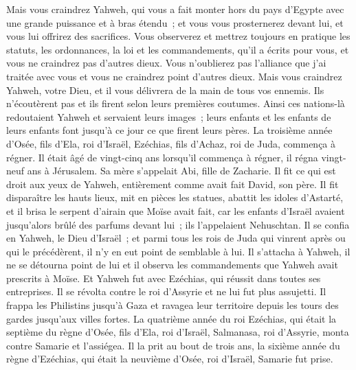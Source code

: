\begin{multicols}{2}
Mais vous craindrez Yahweh, qui vous a fait monter hors du pays d'Egypte avec une grande puissance et à bras étendu~; et vous vous prosternerez devant lui, et vous lui offrirez des sacrifices.
Vous observerez et mettrez toujours en pratique les statuts, les ordonnances, la loi et les commandements, qu'il a écrits pour vous, et vous ne craindrez pas d'autres dieux.
Vous n'oublierez pas l'alliance que j'ai traitée avec vous et vous ne craindrez point d'autres dieux.
Mais vous craindrez Yahweh, votre Dieu, et il vous délivrera de la main de tous vos ennemis.
Ils n'écoutèrent pas et ils firent selon leurs premières coutumes.
Ainsi ces nations-là redoutaient Yahweh et servaient leurs images~; leurs enfants et les enfants de leurs enfants font jusqu'à ce jour ce que firent leurs pères.
\VerseOne{}La troisième année d'Osée, fils d'Ela, roi d'Israël, Ezéchias, fils d'Achaz, roi de Juda, commença à régner.
Il était âgé de vingt-cinq ans lorsqu'il commença à régner, il régna vingt-neuf ans à Jérusalem. Sa mère s'appelait Abi, fille de Zacharie.
Il fit ce qui est droit aux yeux de Yahweh, entièrement comme avait fait David, son père.
Il fit disparaître les hauts lieux, mit en pièces les statues, abattit les idoles d'Astarté, et il brisa le serpent d'airain que Moïse avait fait, car les enfants d'Israël avaient jusqu'alors brûlé des parfums devant lui~; ils l'appelaient Nehuschtan.
Il se confia en Yahweh, le Dieu d'Israël~; et parmi tous les rois de Juda qui vinrent après ou qui le précédèrent, il n'y en eut point de semblable à lui.
Il s'attacha à Yahweh, il ne se détourna point de lui et il observa les commandements que Yahweh avait prescrits à Moïse.
Et Yahweh fut avec Ezéchias, qui réussit dans toutes ses entreprises. Il se révolta contre le roi d'Assyrie et ne lui fut plus assujetti.
Il frappa les Philistins jusqu'à Gaza et ravagea leur territoire depuis les tours des gardes jusqu'aux villes fortes.
La quatrième année du roi Ezéchias, qui était la septième du règne d'Osée, fils d'Ela, roi d'Israël, Salmanasa, roi d'Assyrie, monta contre Samarie et l'assiégea.
Il la prit au bout de trois ans, la sixième année du règne d'Ezéchias, qui était la neuvième d'Osée, roi d'Israël, Samarie fut prise.

\end{multicols}
